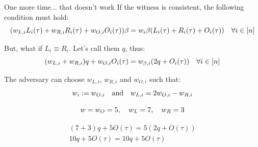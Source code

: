\documentclass{zkdl-presentation-template}
\begin{document}
    \begin{frame}{One more time... that doesn't work}
        If the witness is consistent, the following condition must hold:
        \vspace{-3pt}
        {\small \begin{equation*}
            (w_{L,i}L_i(\tau) + w_{R,i}R_i(\tau) + w_{O,i}O_i(\tau))\beta = w_i\beta(L_i(\tau) + R_i(\tau) + O_i(\tau)) \quad \forall i \in [n]
            \vspace{-10pt}
        \end{equation*}}
        
        
        But, what if $L_i \equiv R_i$. Let's call them $q$, thus:
        \vspace{-3pt}
        \begin{equation*}
            (w_{L,i} + w_{R,i})q + w_{O,i}O_i(\tau)= w_{\beta,i}(2q + O_i(\tau)) \quad \forall i \in [n]
            \vspace{-10pt}
        \end{equation*}

        
        The adversary can choose $w_{L,i}$, $w_{R,i}$ and $w_{O,i}$ such that:
        \vspace{-5pt}
        \begin{equation*}
            w_i := w_{O,i} \quad \text{and} \quad w_{L,i}=2w_{O,i} - w_{R,i}
            \vspace{-5pt}
        \end{equation*} 

        
        \begin{example}
            \begin{equation*}
                w = w_O = 5, \quad w_L = 7, \quad w_R = 3
                \vspace{-25pt}
            \end{equation*}

            \begin{align*}
                (7 + 3)q + 5O(\tau) = 5(2q + O(\tau)) \\
                10q + 5O(\tau) = 10q + 5O(\tau)
            \end{align*}
        \end{example}
    \end{frame}
\end{document}
